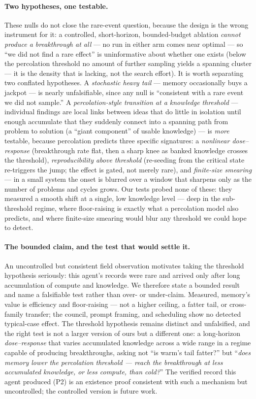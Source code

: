 \documentclass[11pt]{article}
\begin{document}
\paragraph{Two hypotheses, one testable.}
These nulls do not close the rare-event question, because the design is the wrong instrument for
it: a controlled, short-horizon, bounded-budget ablation \emph{cannot produce a breakthrough at
all} --- no run in either arm comes near optimal --- so ``we did not find a rare effect'' is
uninformative about whether one exists (below the percolation threshold no amount of further
sampling yields a spanning cluster --- it is the density that is lacking, not the search effort). It is worth separating two conflated hypotheses. A
\emph{stochastic heavy tail} --- memory occasionally buys a jackpot --- is nearly unfalsifiable,
since any null is ``consistent with a rare event we did not sample.'' A \emph{percolation-style
transition at a knowledge threshold} --- individual findings are local links between ideas that
do little in isolation until enough accumulate that they suddenly connect into a spanning path
from problem to solution (a ``giant component'' of usable knowledge) --- is \emph{more} testable,
because percolation predicts three specific signatures: a \emph{nonlinear dose--response}
(breakthrough rate flat, then a sharp knee as banked knowledge crosses the threshold),
\emph{reproducibility above threshold} (re-seeding from the critical state re-triggers the jump;
the effect is gated, not merely rare), and \emph{finite-size smearing} --- in a small system the
onset is blurred over a window that sharpens only as the number of problems and cycles grows. Our
tests probed none of these: they measured a smooth shift at a single, low knowledge level ---
deep in the sub-threshold regime, where floor-raising is exactly what a percolation model also
predicts, and where finite-size smearing would blur any threshold we could hope to detect.

\paragraph{The bounded claim, and the test that would settle it.}
An uncontrolled but consistent field observation motivates taking the threshold hypothesis
seriously: this agent's records were rare and arrived only after long accumulation of compute and
knowledge. We therefore state a bounded result and name a falsifiable test rather than over- or
under-claim. Measured, memory's value is efficiency and floor-raising --- not a higher ceiling, a
fatter tail, or cross-family transfer; the council, prompt framing, and scheduling show no
detected typical-case effect. The threshold hypothesis remains distinct and unfalsified, and the
right test is not a larger version of ours but a different one: a long-horizon
\emph{dose--response} that varies accumulated knowledge across a wide range in a regime capable of
producing breakthroughs, asking not ``is warm's tail fatter?'' but ``\emph{does memory lower the
percolation threshold --- reach the breakthrough at less accumulated knowledge, or less compute, than cold?}''
The verified record this agent produced (P2) is an existence proof consistent with such a
mechanism but uncontrolled; the controlled version is future work.
\end{document}
